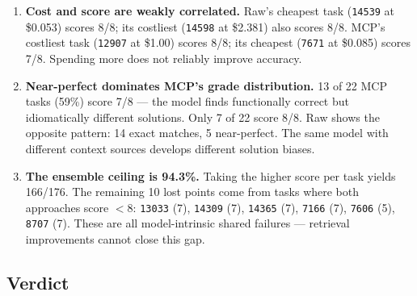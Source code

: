 \begin{enumerate}
\item \textbf{Cost and score are weakly correlated.}
      Raw's cheapest task (\texttt{14539} at \$0.053) scores 8/8;
      its costliest (\texttt{14598} at \$2.381) also scores 8/8.
      MCP's costliest task (\texttt{12907} at \$1.00) scores 8/8;
      its cheapest (\texttt{7671} at \$0.085) scores 7/8.
      Spending more does not reliably improve accuracy.

\item \textbf{Near-perfect dominates MCP's grade distribution.}
      13 of 22 MCP tasks (59\%) score 7/8 --- the model finds
      functionally correct but idiomatically different solutions.
      Only 7 of 22 score 8/8.  Raw shows the opposite pattern: 14
      exact matches, 5 near-perfect.  The same model with different
      context sources develops different solution biases.

\item \textbf{The ensemble ceiling is 94.3\%.}
      Taking the higher score per task yields 166/176.
      The remaining 10 lost points come from tasks where both
      approaches score $<$8: \texttt{13033} (7), \texttt{14309} (7),
      \texttt{14365} (7), \texttt{7166} (7), \texttt{7606} (5),
      \texttt{8707} (7).  These are all model-intrinsic shared failures
      --- retrieval improvements cannot close this gap.

\end{enumerate}

\subsection{Verdict}\label{sec:verdict-sonnet}

